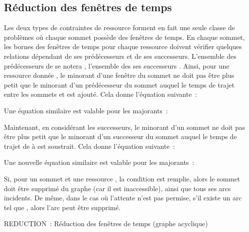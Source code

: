 \documentclass[10pt,francais]{llncs}
\begin{document}
\subsection{R\'eduction des fen\^etres de temps}\label{sub-reduc-reduc}
Les deux types de contraintes de ressource forment en fait une seule classe de probl\`emes o\`u chaque sommet poss\`ede des fen\^etres de temps. En chaque sommet, les bornes des fen\^etres de temps pour chaque ressource doivent v\'erifier quelques relations d\'ependant de ses pr\'ed\'ecesseurs et de ses successeurs. L'ensemble des pr\'ed\'ecesseurs de  se notera , l'ensemble des ses successeurs . Ainsi, pour une ressource donn\'ee , le minorant d'une fen\^etre du sommet  ne doit pas \^etre plus petit que le minorant d'un pr\'ed\'ecesseur  du sommet auquel le temps de trajet entre les sommets  et  est ajout\'e. Cela donne l'\'equation suivante~:

Une \'equation similaire est valable pour les majorants~:

Maintenant, en consid\'erant les successeurs, le minorant d'un sommet  ne doit pas \^etre plus petit que le minorant d'un successeur  du sommet auquel le temps de trajet de  \`a  est soustrait. Cela donne l'\'equation suivante~:

Une nouvelle \'equation similaire est valable pour les majorants~:

Si, pour un sommet  et une ressource , la condition  est remplie, alors le sommet  doit \^etre supprim\'e du graphe (car il est inaccessible), ainsi que tous ses arcs incidents. De m\^eme, dans le cas o\`u l'attente n'est pas permise, s'il existe un arc  tel que , alors l'arc  peut \^etre supprim\'e.\\

\begin{algorithm}\label{algo-reduction}
\caption{REDUCTION~: R\'eduction des fen\^etres de temps (graphe acyclique)}
\BlankLine
{}
\BlankLine
{}\;
\end{algorithm}
\end{document}
